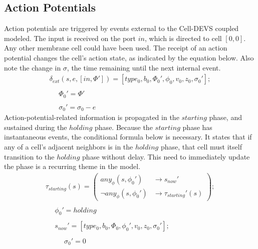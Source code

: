 \documentclass{acm_proc_article-sp}
\begin{document}
\subsection{Action Potentials}
Action potentials are triggered by events external to the Cell-DEVS
coupled modeled.  The input is received on the port $in$, which is 
directed to cell $[0, 0]$.  Any other membrane cell could have been 
used.
The receipt of an action potential changes the cell's action state,
as indicated by the equation below.  Also note the change in 
$\sigma$, the time remaining until the next internal event.
\begin{displaymath} \begin{array}{l}
\delta_{ext}(s, e, [in, \Phi']) = [type_0, b_0, \Phi_0', \phi_0, v_0, z_0, \sigma_0']; \\
\\
\hspace{16pt} \Phi_0' = \Phi' \\
\\
\hspace{16pt} \sigma_0' = \sigma_0 - e
\end{array} \end{displaymath}
Action-potential-related information is propagated in the $starting$ 
phase, and sustained during the $holding$ phase.  Because the 
$starting$ phase has instantaneous events, the conditional
formula below is necessary.  It states that if any of a
cell's adjacent neighbors is in the $holding$ phase, that cell must 
itself transition to the $holding$ phase without delay.  This need
to immediately update the phase is a recurring theme in the
model.
\begin{displaymath} \begin{array}{l}
\tau_{starting}(s) = \left( \begin{array}{ll} any_\phi(s, \phi_0')      & \rightarrow s_{now}' \\
                                              \neg any_\phi(s, \phi_0') & \rightarrow \tau_{starting}'(s) \end{array} \right); \\
\\
\hspace{16pt} \phi_0' = holding \\
\\
\hspace{16pt} s_{now}' = [type_0, b_0, \Phi_0, \phi_0', v_0, z_0, \sigma_0']; \\
\\
\hspace{16pt} \hspace{16pt} \sigma_0' = 0
\end{array} \end{displaymath}
\end{document}
